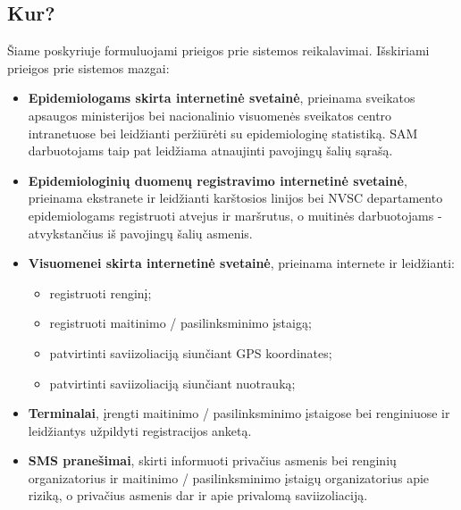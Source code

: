 \documentclass{VUMIFPSkursinis}
\begin{document}
\subsection{Kur?}

Šiame poskyriuje formuluojami prieigos prie sistemos reikalavimai. Išskiriami prieigos prie sistemos mazgai: 
\begin{itemize}
	\item \textbf{Epidemiologams skirta internetinė svetainė}, prieinama sveikatos apsaugos ministerijos bei nacionalinio visuomenės 
	sveikatos centro intranetuose bei leidžianti peržiūrėti su epidemiologinę statistiką. SAM darbuotojams taip pat 
	leidžiama atnaujinti pavojingų šalių sąrašą.
	\item \textbf{Epidemiologinių duomenų registravimo internetinė svetainė}, prieinama ekstranete ir leidžianti karštosios linijos bei NVSC departamento epidemiologams registruoti atvejus ir maršrutus, o muitinės darbuotojams - atvykstančius iš pavojingų šalių asmenis.
	\item \textbf{Visuomenei skirta internetinė svetainė}, prieinama internete ir leidžianti:
	\begin{itemize}
		\item registruoti renginį;
		\item registruoti maitinimo / pasilinksminimo įstaigą;
		\item patvirtinti saviizoliaciją siunčiant GPS koordinates;
		\item patvirtinti saviizoliaciją siunčiant nuotrauką;
	\end{itemize}
	\item \textbf{Terminalai}, įrengti maitinimo / pasilinksminimo įstaigose bei renginiuose ir leidžiantys užpildyti registracijos anketą.
	\item \textbf{SMS pranešimai}, skirti informuoti privačius asmenis bei renginių organizatorius ir maitinimo / pasilinksminimo įstaigų organizatorius apie riziką, o privačius asmenis dar ir apie privalomą saviizoliaciją.
\end{itemize}
\end{document}
